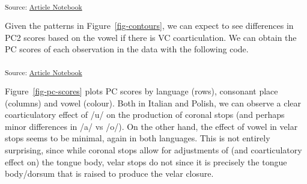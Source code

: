 \documentclass[
]{interact}
\newenvironment{Shaded}{\begin{snugshade}}{\end{snugshade}}
\newcommand{\AttributeTok}[1]{\textcolor[rgb]{0.40,0.45,0.13}{#1}}
\newcommand{\DecValTok}[1]{\textcolor[rgb]{0.68,0.00,0.00}{#1}}
\newcommand{\FunctionTok}[1]{\textcolor[rgb]{0.28,0.35,0.67}{#1}}
\newcommand{\NormalTok}[1]{\textcolor[rgb]{0.00,0.23,0.31}{#1}}
\newcommand{\OtherTok}[1]{\textcolor[rgb]{0.00,0.23,0.31}{#1}}
\newcommand{\SpecialCharTok}[1]{\textcolor[rgb]{0.37,0.37,0.37}{#1}}
\newcommand{\StringTok}[1]{\textcolor[rgb]{0.13,0.47,0.30}{#1}}
\begin{document}
\textsubscript{Source:
\href{https://stefanocoretta.github.io/mv_uti/index.qmd.html}{Article
Notebook}}

Given the patterns in Figure~\ref{fig-contours}, we can expect to see
differences in PC2 scores based on the vowel if there is VC
coarticulation. We can obtain the PC scores of each observation in the
data with the following code.

\begin{Shaded}
\end{Shaded}

\textsubscript{Source:
\href{https://stefanocoretta.github.io/mv_uti/index.qmd.html}{Article
Notebook}}

Figure~\ref{fig-pc-scores} plots PC scores by language (rows), consonant
place (columns) and vowel (colour). Both in Italian and Polish, we can
observe a clear coarticulatory effect of /u/ on the production of
coronal stops (and perhaps minor differences in /a/ vs /o/). On the
other hand, the effect of vowel in velar stops seems to be minimal,
again in both languages. This is not entirely surprising, since while
coronal stops allow for adjustments of (and coarticulatory effect on)
the tongue body, velar stops do not since it is precisely the tongue
body/dorsum that is raised to produce the velar closure.
\end{document}
